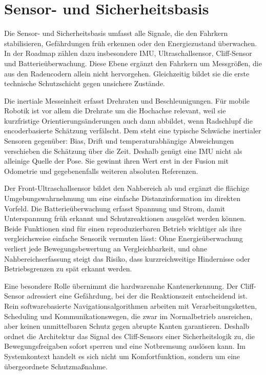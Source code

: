 \section{Sensor- und Sicherheitsbasis}

Die Sensor- und Sicherheitsbasis umfasst alle Signale, die den Fahrkern stabilisieren, Gefährdungen früh erkennen oder den Energiezustand überwachen. In der Roadmap zählen dazu insbesondere IMU, Ultraschallsensor, Cliff-Sensor und Batterieüberwachung. Diese Ebene ergänzt den Fahrkern um Messgrößen, die aus den Radencodern allein nicht hervorgehen. Gleichzeitig bildet sie die erste technische Schutzschicht gegen unsichere Zustände.

Die inertiale Messeinheit erfasst Drehraten und Beschleunigungen. Für mobile Robotik ist vor allem die Drehrate um die Hochachse relevant, weil sie kurzfristige Orientierungsänderungen auch dann abbildet, wenn Radschlupf die encoderbasierte Schätzung verfälscht. Dem steht eine typische Schwäche inertialer Sensoren gegenüber: Bias, Drift und temperaturabhängige Abweichungen verschieben die Schätzung über die Zeit. Deshalb genügt eine IMU nicht als alleinige Quelle der Pose. Sie gewinnt ihren Wert erst in der Fusion mit Odometrie und gegebenenfalls weiteren absoluten Referenzen.

Der Front-Ultraschallsensor bildet den Nahbereich ab und ergänzt die flächige Umgebungswahrnehmung um eine einfache Distanzinformation im direkten Vorfeld. Die Batterieüberwachung erfasst Spannung und Strom, damit Unterspannung früh erkannt und Schutzreaktionen ausgelöst werden können. Beide Funktionen sind für einen reproduzierbaren Betrieb wichtiger als ihre vergleichsweise einfache Sensorik vermuten lässt: Ohne Energieüberwachung verliert jede Bewegungsbewertung an Vergleichbarkeit, und ohne Nahbereichserfassung steigt das Risiko, dass kurzreichweitige Hindernisse oder Betriebsgrenzen zu spät erkannt werden.

Eine besondere Rolle übernimmt die hardwarenahe Kantenerkennung. Der Cliff-Sensor adressiert eine Gefährdung, bei der die Reaktionszeit entscheidend ist. Rein softwarebasierte Navigationsalgorithmen arbeiten mit Verarbeitungsketten, Scheduling und Kommunikationswegen, die zwar im Normalbetrieb ausreichen, aber keinen unmittelbaren Schutz gegen abrupte Kanten garantieren. Deshalb ordnet die Architektur das Signal des Cliff-Sensors einer Sicherheitslogik zu, die Bewegungsfreigaben sofort sperren und eine Notbremsung auslösen kann. Im Systemkontext handelt es sich nicht um Komfortfunktion, sondern um eine übergeordnete Schutzmaßnahme.

